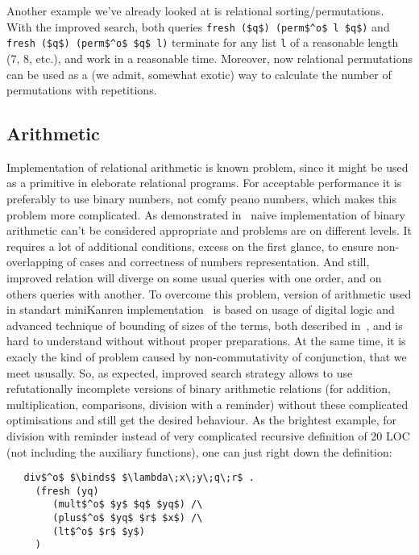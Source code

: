 Another example we've already looked at is relational sorting/permutations. 
With the improved search, both queries \lstinline|fresh ($q$) (perm$^o$ l $q$)| and 
\lstinline|fresh ($q$) (perm$^o$ $q$ l)| terminate for any list \lstinline|l| of a reasonable 
length (7, 8, etc.), and work in a reasonable time. Moreover, now
relational permutations can be used as a (we admit, somewhat exotic) way to calculate 
the number of permutations with repetitions.

\subsection{Arithmetic}

Implementation of relational arithmetic is known problem, since it might be used as a primitive in eleborate relational programs. For acceptable performance it is preferably to use binary numbers, not comfy peano numbers, which makes this problem more complicated. As demonstrated in~\cite{WillThesis} naive implementation of binary arithmetic can't be considered appropriate and problems are on different levels. It requires a lot of additional conditions, excess on the first glance, to ensure non-overlapping of cases and correctness of numbers representation. And still, improved relation will diverge on some usual queries with one order, and on others queries with another. To overcome this problem, version of arithmetic used in standart miniKanren implementation~\cite{TRS} is based on usage of digital logic and advanced technique of bounding of sizes of the terms, both described in~\cite{KiselyovArithmetic}, and is hard to understand without without proper preparations. At the same time, it is exacly the kind of problem caused by non-commutativity of conjunction, that we meet ususally. So, as expected, improved search strategy allows to use refutationally incomplete versions of binary arithmetic relations (for addition, multiplication, comparisons, division with a reminder) without these complicated optimisations and still get the desired behaviour. As the brightest example, for division with reminder instead of very complicated recursive definition of 20 LOC (not including the auxiliary functions), one can just right down the definition:

\begin{lstlisting}
   div$^o$ $\binds$ $\lambda\;x\;y\;q\;r$ . 
     (fresh (yq)        
        (mult$^o$ $y$ $q$ $yq$) /\
        (plus$^o$ $yq$ $r$ $x$) /\
        (lt$^o$ $r$ $y$)
     )
\end{lstlisting}

